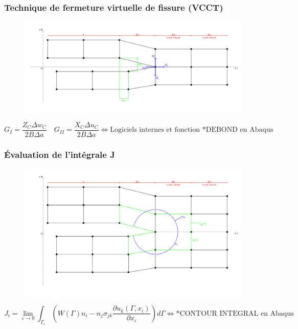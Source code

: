 \documentclass[first,firstsupp,lastsupp,handout,last,hyperref,table]{ETHclass}
\begin{document}
\begin{frame}
\frametitle{Technique de fermeture virtuelle de fissure (VCCT)}
\vspace{-1.5cm}
\centering
\scriptsize
\begin{figure}[!h]
\centering
\includegraphics[height=0.6\textheight]{VCCT.pdf}
  \label{fig:vcct}
\end{figure}
\begin{equation*}
G_{I}=\frac{Z_{C}\Delta w_{C}}{2B\Delta a}\quad G_{II}=\frac{X_{C}\Delta u_{C}}{2B\Delta a}\Longleftrightarrow\text{Logiciels internes et fonction *DEBOND en Abaqus}
\end{equation*}
\end{frame}

\begin{frame}
\frametitle{\'Evaluation de l'int\'egrale J}
\vspace{-0.75cm}
\centering
\begin{figure}[!h]
\centering
\includegraphics[height=0.6\textheight]{J-integral.pdf}
  \label{fig:jintegral}
\end{figure}
\scriptsize
\begin{equation*}
J_{i}=\lim_{\varepsilon\to 0}\int_{\Gamma_{\varepsilon}}\left(W\left(\Gamma\right)n_{i}-n_{j}\sigma_{jk}\frac{\partial u_{k}\left(\Gamma,x_{i}\right)}{\partial x_{i}}\right)d\Gamma\Longleftrightarrow\text{*CONTOUR INTEGRAL en Abaqus}
\end{equation*}
\end{frame}
\end{document}
